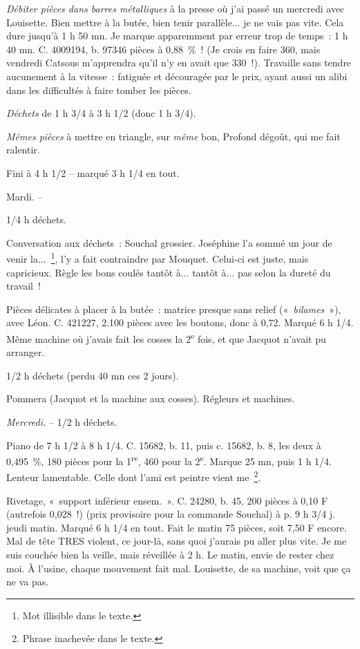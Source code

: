 \documentclass[french,twoside]{book} %
\begin{document}
{\itshape Débiter pièces dans barres métalliques} à la presse où j'ai passé un mercredi avec Louisette. Bien mettre à la butée, bien tenir parallèle... je ne vais pas vite. Cela dure jusqu'à 1 h 50 mn. Je marque apparemment par erreur trop de temps : 1 h 40 mn. C. 4009194, b. 97346 pièces à 0,88 \% ! (Je crois en faire 360, mais vendredi Catsous m'apprendra qu'il n'y en avait que 330 !). Travaille sans tendre aucunement à la vitesse : fatiguée et découragée par le prix, ayant aussi un alibi dans les difficultés à faire tomber les pièces.\par
{\itshape Déchets} de 1 h 3/4 à 3 h 1/2 (donc 1 h 3/4).\par
{\itshape Mêmes pièces} à mettre en triangle, sur {\itshape même} bon, Profond dégoût, qui me fait ralentir.\par
Fini à 4 h 1/2 – marqué 3 h 1/4 en tout.\par
Mardi. –\par
1/4 h déchets.\par
Conversation aux déchets : Souchal grossier. Joséphine l'a sommé un jour de venir la... \footnote{Mot illisible dans le texte.}, l'y a fait contraindre par Mouquet. Celui-ci est juste, mais capricieux. Règle les bons coulés tantôt à... tantôt à... pas selon la dureté du travail !\par
Pièces délicates à placer à la butée : matrice presque sans relief (« {\itshape bilames} »), avec Léon. C. 421227, 2.100 pièces avec les boutons, donc à 0,72. Marqué 6 h 1/4. Même machine où j'avais fait les cosses la 2\textsuperscript{e} fois, et que Jacquot n'avait pu arranger.\par
1/2 h déchets (perdu 40 mn ces 2 jours).\par
Pommera (Jacquot et la machine aux cosses). Régleurs et machines.\par
{\itshape Mercredi.} – 1/2 h déchets.\par
Piano de 7 h 1/2 à 8 h 1/4. C. 15682, b. 11, puis c. 15682, b. 8, les deux à 0,495 \%, 180 pièces pour la 1\textsuperscript{re}, 460 pour la 2\textsuperscript{e}. Marque 25 mn, puis 1 h 1/4. Lenteur lamentable. Celle dont l'ami est peintre vient me \footnote{Phrase inachevée dans le texte.}.\par
Rivetage, « support inférieur ensem. ». C. 24280, b. 45, 200 pièces à 0,10 F (autrefois 0,028 !) (prix provisoire pour la commande Souchal) à p. 9 h 3/4 j. jeudi matin. Marqué 6 h 1/4 en tout. Fait le matin 75 pièces, soit 7,50 F encore. Mal de tête TRES violent, ce jour-là, sans quoi j'aurais pu aller plus vite. Je me suis couchée bien la veille, mais réveillée à 2 h. Le matin, envie de rester chez moi. À l'usine, chaque mouvement fait mal. Louisette, de sa machine, voit que ça ne va pas.\par
\end{document}
